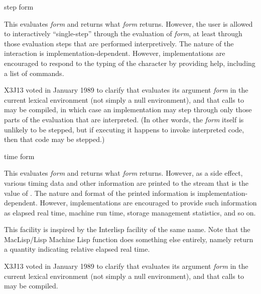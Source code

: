 \begin{defmac}
step form

This evaluates {\it form} and returns what {\it form} returns.
However, the user is allowed to interactively
``single-step'' through the evaluation of {\it form}, at least
through those evaluation steps that are performed interpretively.
The nature of the interaction is implementation-dependent.
However, implementations are encouraged to respond to the typing
of the character  by providing help, including a list
of commands.

\begin{new}
X3J13 voted in January 1989
to clarify that  evaluates its argument {\it form}
in the current lexical environment (not simply a null environment),
and that calls to  may be compiled, in which case
an implementation may step through only those parts of the
evaluation that are interpreted.  (In other words, the {\it form}
itself is unlikely to be stepped, but if executing it happens to
invoke interpreted code, then that code may be stepped.)
\end{new}
\end{defmac}

\begin{defmac}
time form

This evaluates {\it form} and returns what {\it form} returns.  However, as
a side effect, various timing data and other information are printed to
the stream that is the value of .  The nature and
format of the printed information is implementation-dependent.  However,
implementations are encouraged to provide such information as elapsed
real time, machine run time, storage management statistics, and so on.

\beforenoterule
\begin{incompatibility}
This facility is inspired by the Interlisp
facility of the same name.  Note that the MacLisp/Lisp Machine Lisp function 
does something else entirely, namely return a quantity indicating
relative elapsed real time.
\end{incompatibility}
\afternoterule

\begin{new}
X3J13 voted in January 1989
to clarify that  evaluates its argument {\it form}
in the current lexical environment (not simply a null environment),
and that calls to  may be compiled.
\end{new}
\end{defmac}

